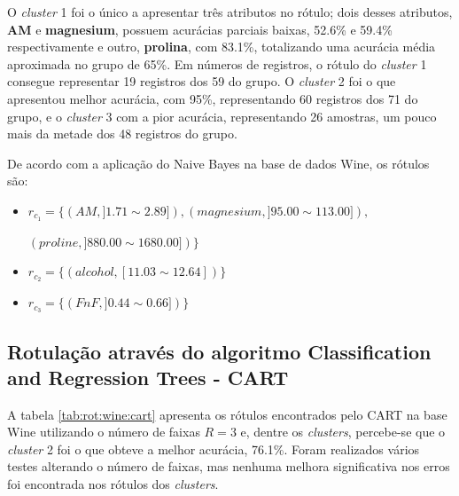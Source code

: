 O \textit{cluster} 1 foi o único a apresentar três atributos no rótulo; dois desses atributos, \textbf{AM} e \textbf{magnesium}, possuem acurácias parciais baixas, 52.6\% e 59.4\% respectivamente e outro, \textbf{prolina}, com 83.1\%, totalizando uma acurácia média aproximada no grupo de 65\%. Em números de registros, o rótulo do \textit{cluster} 1 consegue representar 19 registros dos 59 do grupo. O \textit{cluster} 2 foi o que apresentou melhor acurácia, com 95\%, representando 60 registros dos 71 do grupo, e o \textit{cluster} 3 com a pior acurácia, representando 26 amostras, um pouco mais da metade dos 48 registros do grupo. 




De acordo com a aplicação do Naive Bayes na base de dados Wine, os rótulos são: 

\begin{itemize}[noitemsep]
    \item ${r_{c_1}=\{ (AM, ] 1.71  \sim  2.89]),(magnesium, ] 95.00 \sim  113.00]),}$
    
    ${(proline, ] 880.00 \sim 1680.00]) \} }$
    \item ${r_{c_2}=\{(alcohol,[   11.03 \sim  12.64  ] ) \} }$
    \item ${r_{c_3}=\{ (FnF, ] 0.44 \sim 0.66 ])\} }$
 \end{itemize}


\subsection{Rotulação através do algoritmo Classification and Regression Trees - CART} \label{cap:resultados:ssec:wine:cart}

A tabela \ref{tab:rot:wine:cart} apresenta os rótulos encontrados pelo CART na base Wine utilizando o número de faixas ${R=3}$ e, dentre os \textit{clusters}, percebe-se que o \textit{cluster} 2 foi o que obteve a melhor acurácia, 76.1\%. Foram realizados vários testes alterando o número de faixas, mas nenhuma melhora significativa nos erros foi encontrada nos rótulos dos \textit{clusters}. 


